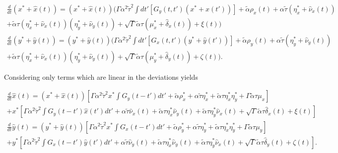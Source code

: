 \documentclass[.../main.tex]{subfiles}
\begin{document}
\begin{equation}
	\begin{split}
		\frac{d}{dt} (x^* + \hat{x}(t)) = (x^* + \hat{x}(t))(\Gamma \alpha^2 \tilde{\tau}^2 \int dt'
		[G_y(t, t')(x^* + \hat{x}(t'))] + \tilde{\alpha} \rho_x(t) + \alpha \tilde{\tau} (\eta_x^* + \hat{\nu}_x
		(t)) \\ + \tilde{\alpha} \tau (\eta_x^* + \hat{\nu}_x(t)) (\eta_y^* + \hat{\nu}_y(t)) + \sqrt{\Gamma} \tilde{\alpha} \tau (\mu_x^* + \hat{\delta}_x(t)) + \xi(t)) \\
		\frac{d}{dt} (y^* + \hat{y}(t)) = (y^* + \hat{y}(t))(\Gamma \alpha^2 \tilde{\tau}^2 \int dt'
		[G_x(t, t')(y^* + \hat{y}(t'))] + \tilde{\alpha} \rho_y(t) + \alpha \tilde{\tau} (\eta_y^* + \hat{\nu}_y
		(t)) \\ + \tilde{\alpha} \tau (\eta_x^* + \hat{\nu}_x(t)) (\eta_y^* + \hat{\nu}_y(t))
		 + \sqrt{\Gamma} \tilde{\alpha} \tau (\mu_y^* + \hat{\delta}_y(t)) + \zeta(t)).
	\end{split}
\end{equation}

Considering only terms which are linear in the deviations yields

\begin{equation} 
	\label{eqn::appLinearisation}
	\begin{split}
	\frac{d}{dt} \hat{x}(t) = (x^* + \hat{x}(t))\left[ \Gamma \alpha^2 \tilde{\tau}^2 x^* \int G_y(t - t') dt' + \tilde{\alpha} \rho_x^* + \alpha \tilde{\tau} \eta_x^* + \tilde{\alpha} \tau \eta_x^* \eta_y^* + \Gamma \tilde{\alpha} \tau \mu_x \right] \\
	+ x^* \left[ \Gamma \alpha^2 \tilde{\tau}^2 \int G_y(t - t') \hat{x}(t') dt' + \alpha \tilde{\tau} \hat{\nu}_x(t) + \tilde{\alpha} \tau \eta_x^* \hat{\nu}_y(t) + \tilde{\alpha} \tau \eta_y^* \hat{\nu}_x(t) + \sqrt{\Gamma} \tilde{\alpha} \tau \hat{\delta}_x(t) + \xi(t) \right]\\
	\frac{d}{dt} \hat{y}(t) = (y^* + \hat{y}(t))\left[ \Gamma \alpha^2 \tilde{\tau}^2 x^* \int G_x(t - t') dt' + \tilde{\alpha} \rho_y^* + \alpha \tilde{\tau} \eta_y^* + \tilde{\alpha} \tau \eta_x^* \eta_y^* + \Gamma \tilde{\alpha} \tau \mu_y \right] \\
	+ y^* \left[ \Gamma \alpha^2 \tilde{\tau}^2 \int G_x(t - t') \hat{y}(t') dt' + \alpha \tilde{\tau} \hat{\nu}_y(t) + \tilde{\alpha} \tau \eta_x^* \hat{\nu}_y(t) + \tilde{\alpha} \tau \eta_y^* \hat{\nu}_x(t) + \sqrt{\Gamma} \tilde{\alpha} \tau \hat{\delta}_y(t) + \zeta(t) \right].\\
	\end{split}
\end{equation}
\end{document}
